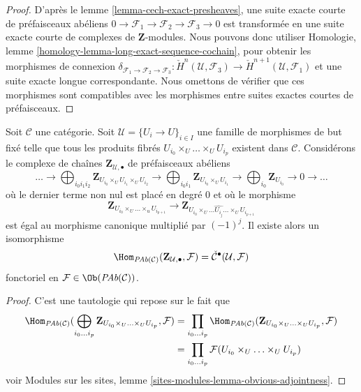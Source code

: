 \begin{proof}
D'après le
lemme \ref{lemma-cech-exact-presheaves},
une suite exacte courte de préfaisceaux abéliens
$0 \to \mathcal{F}_1 \to \mathcal{F}_2 \to \mathcal{F}_3 \to 0$
est transformée en une suite exacte courte de complexes de
$\mathbf{Z}$-modules. Nous pouvons donc utiliser
Homologie, lemme \ref{homology-lemma-long-exact-sequence-cochain},
pour obtenir les morphismes de connexion
$\delta_{\mathcal{F}_1 \to \mathcal{F}_2 \to \mathcal{F}_3} :
\check{H}^n(\mathcal{U}, \mathcal{F}_3) \to
\check{H}^{n + 1}(\mathcal{U}, \mathcal{F}_1)$
et une suite exacte longue correspondante. Nous omettons de vérifier
que ces morphismes sont compatibles avec les morphismes entre suites exactes
courtes de préfaisceaux.
\end{proof}

\begin{lemma}
\label{lemma-cech-map-into}
Soit $\mathcal{C}$ une catégorie. Soit $\mathcal{U} = \{U_i \to U\}_{i \in I}$
une famille de morphismes de but fixé telle que tous les produits fibrés
$U_{i_0} \times_U \ldots \times_U U_{i_p}$ existent dans $\mathcal{C}$.
Considérons le complexe de chaînes $\mathbf{Z}_{\mathcal{U}, \bullet}$
de préfaisceaux abéliens
$$
\ldots
\to
\bigoplus_{i_0i_1i_2} \mathbf{Z}_{U_{i_0} \times_U U_{i_1} \times_U U_{i_2}}
\to
\bigoplus_{i_0i_1} \mathbf{Z}_{U_{i_0} \times_U U_{i_1}}
\to
\bigoplus_{i_0} \mathbf{Z}_{U_{i_0}}
\to 0 \to \ldots
$$
où le dernier terme non nul est placé en degré $0$
et où le morphisme
$$
\mathbf{Z}_{U_{i_0} \times_U \ldots \times_u U_{i_{p + 1}}}
\longrightarrow
\mathbf{Z}_{U_{i_0} \times_U
\ldots \widehat{U_{i_j}} \ldots \times_U U_{i_{p + 1}}}
$$
est égal au morphisme canonique multiplié par $(-1)^j$.
Il existe alors un isomorphisme
$$
\Hom_{\textit{PAb}(\mathcal{C})}(\mathbf{Z}_{\mathcal{U}, \bullet}, \mathcal{F})
=
\check{\mathcal{C}}^\bullet(\mathcal{U}, \mathcal{F})
$$
fonctoriel en $\mathcal{F} \in \Ob(\textit{PAb}(\mathcal{C}))$.
\end{lemma}

\begin{proof}
C'est une tautologie qui repose sur le fait que
\begin{align*}
\Hom_{\textit{PAb}(\mathcal{C})}(
\bigoplus_{i_0 \ldots i_p}
\mathbf{Z}_{U_{i_0} \times_U \ldots \times_U U_{i_p}},
\mathcal{F})
& =
\prod_{i_0 \ldots i_p}
\Hom_{\textit{PAb}(\mathcal{C})}(
\mathbf{Z}_{U_{i_0} \times_U \ldots \times_U U_{i_p}},
\mathcal{F}) \\
& =
\prod_{i_0 \ldots i_p}
\mathcal{F}(U_{i_0} \times_U \ldots \times_U U_{i_p})
\end{align*}
voir Modules sur les sites, lemme \ref{sites-modules-lemma-obvious-adjointness}.
\end{proof}

